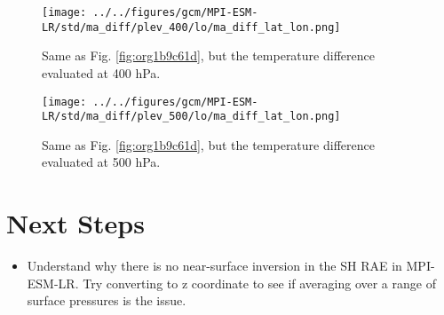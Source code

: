 \documentclass[11pt]{article}
\begin{document}
\begin{figure}[htbp]
\centering
\texttt{[image: ../../figures/gcm/MPI-ESM-LR/std/ma\_diff/plev\_400/lo/ma\_diff\_lat\_lon.png]}
\caption{\label{fig:orgf6fa329}Same as Fig. \ref{fig:org1b9c61d}, but the temperature difference evaluated at 400 hPa.}
\end{figure}

\begin{figure}[htbp]
\centering
\texttt{[image: ../../figures/gcm/MPI-ESM-LR/std/ma\_diff/plev\_500/lo/ma\_diff\_lat\_lon.png]}
\caption{\label{fig:orge273189}Same as Fig. \ref{fig:org1b9c61d}, but the temperature difference evaluated at 500 hPa.}
\end{figure}

\section{Next Steps}
\label{sec:org382cad9}
\begin{itemize}
\item Understand why there is no near-surface inversion in the SH RAE in MPI-ESM-LR. Try converting to z coordinate to see if averaging over a range of surface pressures is the issue.
\end{itemize}



\end{document}
